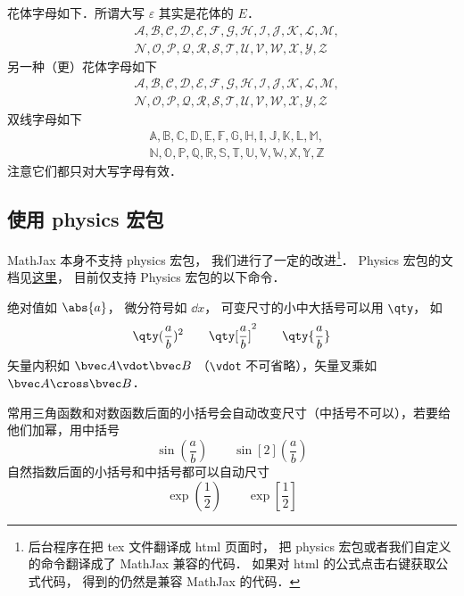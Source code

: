 花体字母如下．所谓大写 $\varepsilon$ 其实是花体的 $E$． 
\begin{equation}
\begin{aligned}
&\mathcal{A, B, C, D, E, F, G, H, I, J, K, L, M,}\\
&\mathcal{N, O, P, Q, R, S, T, U, V, W, X, Y, Z}
\end{aligned}
\end{equation}
另一种（更）花体字母如下
\begin{equation}
\begin{aligned}
&\mathscr{A, B, C, D, E, F, G, H, I, J, K, L, M,}\\
&\mathscr{N, O, P, Q, R, S, T, U, V, W, X, Y, Z}
\end{aligned}
\end{equation}
双线字母如下
\begin{equation}
\begin{aligned}
&\mathbb{A, B, C, D, E, F, G, H, I, J, K, L, M,}\\
&\mathbb{N, O, P, Q, R, S, T, U, V, W, X, Y, Z}
\end{aligned}
\end{equation}
注意它们都只对大写字母有效．

\subsection{使用 physics 宏包}
MathJax 本身不支持 physics 宏包， 我们进行了一定的改进\footnote{后台程序在把 tex 文件翻译成 html 页面时， 把 physics 宏包或者我们自定义的命令翻译成了 MathJax 兼容的代码． 如果对 html 的公式点击右键获取公式代码， 得到的仍然是兼容 MathJax 的代码．}． Physics 宏包的文档见\href{http://mirrors.ibiblio.org/CTAN/macros/latex/contrib/physics/physics.pdf}{这里}， 目前仅支持 Physics 宏包的以下命令．

绝对值如 $\abs{a}$， 微分符号如 $\dd{x}$， 可变尺寸的小中大括号可以用 \verb|\qty|， 如
\begin{equation}
\qty(\frac ab)^2 \qquad \qty[\frac ab]^2 \qquad \qty{ \frac ab}
\end{equation}
矢量内积如 $\bvec A \vdot \bvec B$ （\verb|\vdot| 不可省略），矢量叉乘如 $\bvec A\cross\bvec B$．

常用三角函数和对数函数后面的小括号会自动改变尺寸（中括号不可以），若要给他们加幂，用中括号
\begin{equation}
\sin(\frac ab) \qquad \sin[2](\frac ab)
\end{equation}
自然指数后面的小括号和中括号都可以自动尺寸
\begin{equation}
\exp(\frac12) \qquad \exp[\frac12]
\end{equation}

